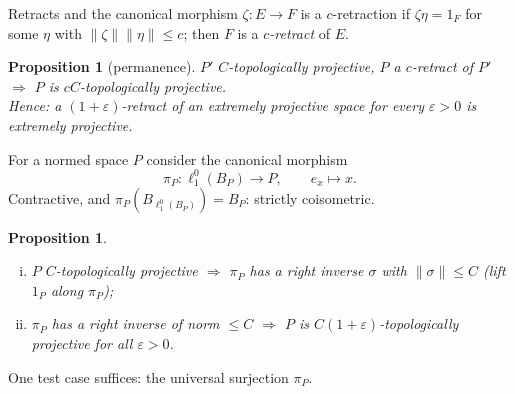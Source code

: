 \documentclass[10pt,aspectratio=169]{beamer}
\newtheorem{proposition}[theorem]{Proposition}
\newcommand{\lo}[1]{\ell_1^0(#1)}
\begin{document}
\begin{frame}{Retracts and the canonical morphism}
  $\zeta\colon E\to F$ is a \alert{$c$-retraction} if $\zeta\eta=1_F$ for some
  $\eta$ with $\|\zeta\|\|\eta\|\le c$; then $F$ is a \emph{$c$-retract} of $E$.
  \begin{proposition}[permanence]
    $P'$ $C$-topologically projective, $P$ a $c$-retract of $P'$
    $\Rightarrow$ $P$ is $cC$-topologically projective. \\
    Hence: a $(1+\varepsilon)$-retract of an extremely projective space for every
    $\varepsilon>0$ is extremely projective.
  \end{proposition}
  \medskip
  For a normed space $P$ consider the \alert{canonical morphism}
  \[
    \pi_P\colon\lo{B_P}\to P,\qquad e_x\mapsto x .
  \]
  Contractive, and $\pi_P(B_{\lo{B_P}})=B_P$: strictly coisometric.
  \begin{proposition}
    \begin{enumerate}[(i)]
      \item $P$ $C$-topologically projective $\Rightarrow$ $\pi_P$ has a right
        inverse $\sigma$ with $\|\sigma\|\le C$ (lift $1_P$ along $\pi_P$);
      \item $\pi_P$ has a right inverse of norm $\le C$ $\Rightarrow$ $P$ is
        $C(1+\varepsilon)$-topologically projective for all $\varepsilon>0$.
    \end{enumerate}
  \end{proposition}
  One test case suffices: the universal surjection $\pi_P$.
\end{frame}
\end{document}
